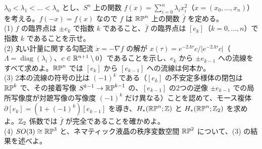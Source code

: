 \begin{problem}[難易度 C]\label{ch11-prob-rpn}
$\lambda_0<\lambda_1<\dots<\lambda_n$ とし、$S^n$ 上の関数 $f(x)=\sum_{i=0}^n\lambda_ix_i^2$（$x=(x_0,\dots,x_n)$）を考える。$f(-x)=f(x)$ なので $f$ は $\mathbb{RP}^n$ 上の関数 $\bar f$ を定める。\\
(1) $f$ の臨界点は $\pm e_k$ で指数 $k$ であること、$\bar f$ の臨界点は $[e_k]$（$k=0,\dots,n$）で指数 $k$ であることを示せ。\\
(2) 丸い計量に関する勾配流 $\dot x=-\nabla f$ の解が $x(\tau)=e^{-2\Lambda\tau}c/\lvert e^{-2\Lambda\tau}c\rvert$（$\Lambda=\operatorname{diag}(\lambda_i)$、$c\in\mathbb{R}^{n+1}\setminus0$）であることを示し、$e_k$ から $\pm e_{k-1}$ への流線をすべて求めよ。$\mathbb{RP}^n$ では $[e_k]$ から $[e_{k-1}]$ への流線は何本か。\\
(3) 2本の流線の符号の比は $(-1)^k$ である（$[e_k]$ の不安定多様体の閉包は $\mathbb{RP}^k$ で、その接着写像 $S^{k-1}\to\mathbb{RP}^{k-1}$ の、$[e_{k-1}]$ の2つの逆像 $\pm e_{k-1}$ での局所写像度が対蹠写像の写像度 $(-1)^k$ だけ異なる）ことを認めて、モース複体 $\partial[e_k]=(1+(-1)^k)[e_{k-1}]$ を導き、$H_*(\mathbb{RP}^n;\mathbb{Z})$ と $H_*(\mathbb{RP}^n;\mathbb{Z}_2)$ を求めよ。$\mathbb{Z}_2$ 係数では $\bar f$ が完全であることを確かめよ。\\
(4) $SO(3)\cong\mathbb{RP}^3$ と、ネマティック液晶の秩序変数空間 $\mathbb{RP}^2$ について、(3) の結果を述べよ。
\end{problem}


